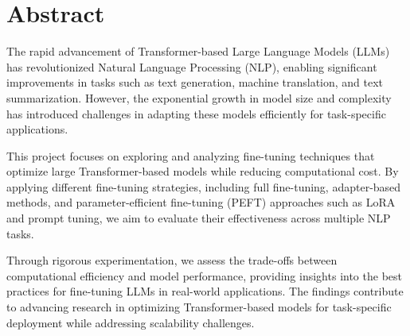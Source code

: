 \chapter{Abstract}

The rapid advancement of Transformer-based Large Language Models (LLMs) has revolutionized Natural Language Processing (NLP), enabling significant improvements in tasks such as text generation, machine translation, and text summarization. However, the exponential growth in model size and complexity has introduced challenges in adapting these models efficiently for task-specific applications.

This project focuses on exploring and analyzing fine-tuning techniques that optimize large Transformer-based models while reducing computational cost. By applying different fine-tuning strategies, including full fine-tuning, adapter-based methods, and parameter-efficient fine-tuning (PEFT) approaches such as LoRA and prompt tuning, we aim to evaluate their effectiveness across multiple NLP tasks. 

Through rigorous experimentation, we assess the trade-offs between computational efficiency and model performance, providing insights into the best practices for fine-tuning LLMs in real-world applications. The findings contribute to advancing research in optimizing Transformer-based models for task-specific deployment while addressing scalability challenges.

\newpage
